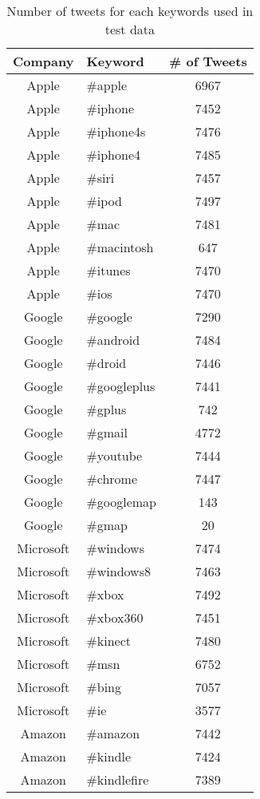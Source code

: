 \documentclass[12pt]{article}
\begin{document}
\begin{table}
\begin{center}
    \begin{tabular}{ | c || l | c | }
        \hline
        \textbf{Company} &  \textbf{Keyword} & \textbf{\# of Tweets} \\ \hline
        \hline
        Apple &  \#apple & 6967 \\ \hline
        Apple &  \#iphone & 7452 \\ \hline
        Apple &  \#iphone4s & 7476 \\ \hline
        Apple &  \#iphone4 & 7485 \\ \hline
        Apple &  \#siri & 7457 \\ \hline
        Apple &  \#ipod & 7497 \\ \hline
        Apple &  \#mac & 7481 \\ \hline
        Apple &  \#macintosh & 647 \\ \hline
        Apple &  \#itunes & 7470 \\ \hline
        Apple &  \#ios & 7470 \\ \hline
        Google &  \#google & 7290 \\ \hline
        Google &  \#android & 7484 \\ \hline
        Google &  \#droid & 7446 \\ \hline
        Google &  \#googleplus & 7441 \\ \hline
        Google &  \#gplus & 742 \\ \hline
        Google &  \#gmail & 4772 \\ \hline
        Google &  \#youtube & 7444 \\ \hline
        Google &  \#chrome & 7447 \\ \hline
        Google &  \#googlemap & 143 \\ \hline
        Google &  \#gmap & 20 \\ \hline
        Microsoft &  \#windows & 7474 \\ \hline
        Microsoft &  \#windows8 & 7463 \\ \hline
        Microsoft &  \#xbox & 7492 \\ \hline
        Microsoft &  \#xbox360 & 7451 \\ \hline
        Microsoft &  \#kinect & 7480 \\ \hline
        Microsoft &  \#msn & 6752 \\ \hline
        Microsoft &  \#bing & 7057 \\ \hline
        Microsoft &  \#ie & 3577 \\ \hline
        Amazon &  \#amazon & 7442 \\ \hline
        Amazon &  \#kindle & 7424 \\ \hline
        Amazon &  \#kindlefire & 7389 \\ \hline
        \hline
    \end{tabular}
\caption{Number of tweets for each keywords used in test data}
\label{keywords-tweet-numbers} %
\end{center}
\end{table}
\end{document}
